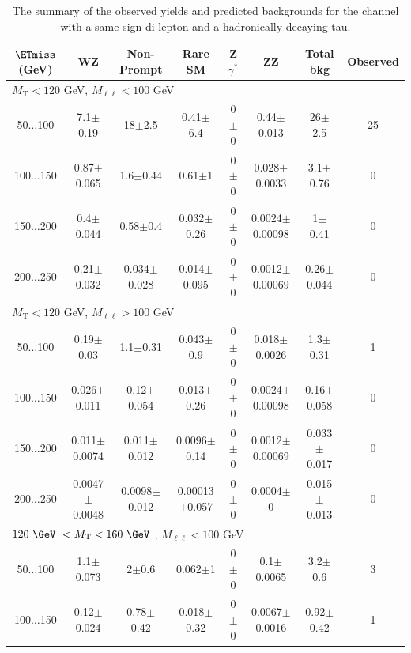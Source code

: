 \begin{landscape}
\begin{table}
\begin{center}
\begin{tabular}{| c | c c c c c c c | }
\hline\hline
\end{tabular}
\end{center}
\end{table}
\begin{table}
\small
\begin{center}
\caption{\label{tab:SStau1} The summary of the observed yields and predicted backgrounds for the channel with a same sign di-lepton and a hadronically decaying tau. }
\begin{tabular}{| c | c c c c c c c | }\hline\hline
$\ETmiss$ (GeV) & WZ & Non-Prompt & Rare SM & Z$\gamma^*$ & ZZ & Total bkg & Observed\\\hline\hline
\multicolumn{8}{l}{$M_{\text{T}} < 120$ GeV, $M_{\ell\ell} < 100$ GeV}\\\hline\hline
50$\dots$100&7.1$\pm$0.19&18$\pm$2.5&0.41$\pm$6.4&0$\pm$0&0.44$\pm$0.013&26$\pm$2.5&25\\
100$\dots$150&0.87$\pm$0.065&1.6$\pm$0.44&0.61$\pm$1&0$\pm$0&0.028$\pm$0.0033&3.1$\pm$0.76&0\\
150$\dots$200&0.4$\pm$0.044&0.58$\pm$0.4&0.032$\pm$0.26&0$\pm$0&0.0024$\pm$0.00098&1$\pm$0.41&0\\
200$\dots$250&0.21$\pm$0.032&0.034$\pm$0.028&0.014$\pm$0.095&0$\pm$0&0.0012$\pm$0.00069&0.26$\pm$0.044&0\\
\hline\hline
\multicolumn{8}{l}{$M_{\text{T}} < 120$ GeV, $M_{\ell\ell} > 100$ GeV}\\\hline\hline
50$\dots$100&0.19$\pm$0.03&1.1$\pm$0.31&0.043$\pm$0.9&0$\pm$0&0.018$\pm$0.0026&1.3$\pm$0.31&1\\
100$\dots$150&0.026$\pm$0.011&0.12$\pm$0.054&0.013$\pm$0.26&0$\pm$0&0.0024$\pm$0.00098&0.16$\pm$0.058&0\\
150$\dots$200&0.011$\pm$0.0074&0.011$\pm$0.012&0.0096$\pm$0.14&0$\pm$0&0.0012$\pm$0.00069&0.033$\pm$0.017&0\\
200$\dots$250&0.0047$\pm$0.0048&0.0098$\pm$0.012&0.00013$\pm$0.057&0$\pm$0&0.0004$\pm$0&0.015$\pm$0.013&0\\
\hline\hline
\multicolumn{8}{l}{$120~\GeV~< M_{\text{T}} < 160~\GeV~$, $M_{\ell\ell} < 100$ GeV}\\\hline\hline
50$\dots$100&1.1$\pm$0.073&2$\pm$0.6&0.062$\pm$1&0$\pm$0&0.1$\pm$0.0065&3.2$\pm$0.6&3\\
100$\dots$150&0.12$\pm$0.024&0.78$\pm$0.42&0.018$\pm$0.32&0$\pm$0&0.0067$\pm$0.0016&0.92$\pm$0.42&1\\

\end{tabular}
\end{center}
\end{table}
\end{landscape}
